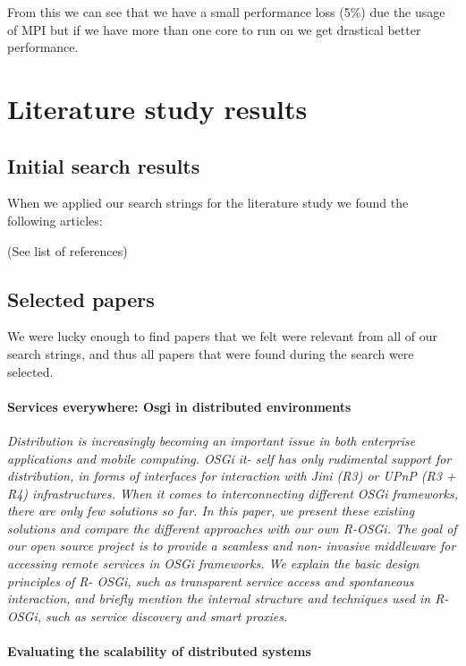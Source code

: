 \documentclass{article}
\begin{document}
From this we can see that we have a small performance loss (5\%) due the usage
of MPI but if we have more than one core to run on we get drastical better
performance.
 
\section{Literature study results}

\subsection{Initial search results}
When we applied our search strings for the literature study we found the
following articles:

(See list of references)

\subsection{Selected papers}
We were lucky enough to find papers that we felt were relevant from all of our
search strings, and thus all papers that were found during the search were
selected.

\paragraph{Services everywhere: Osgi in distributed environments}
\cite{rellermeyer2007services}

\emph{Distribution is increasingly becoming an important issue in both
enterprise applications and mobile computing. OSGi it- self has only rudimental
support for distribution, in forms of interfaces for interaction with Jini (R3)
or UPnP (R3 + R4) infrastructures. When it comes to interconnecting different
OSGi frameworks, there are only few solutions so far. In this paper, we present
these existing solutions and compare the different approaches with our own
R-OSGi. The goal of our open source project is to provide a seamless and non-
invasive middleware for accessing remote services in OSGi frameworks. We
explain the basic design principles of R- OSGi, such as transparent service
access and spontaneous interaction, and briefly mention the internal structure
and techniques used in R-OSGi, such as service discovery and smart proxies.}

\paragraph{Evaluating the scalability of distributed systems}
\cite{jogalekar2000evaluating}
\end{document}
